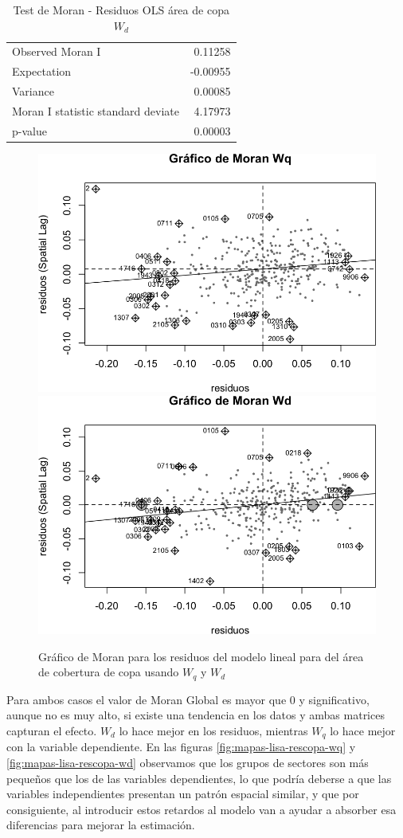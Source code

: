 \documentclass[12pt,]{book}
\begin{document}
\begin{table}

\caption{\label{tab:moran-rescopa-wd}Test de Moran - Residuos OLS área de copa $W_d$}
\centering
\begin{tabular}[t]{lr}
\toprule
  &  \\
\midrule
Observed Moran I & 0.11258\\
Expectation & -0.00955\\
Variance & 0.00085\\
Moran I statistic standard deviate & 4.17973\\
p-value & 0.00003\\
\bottomrule
\end{tabular}
\end{table}

\begin{figure}
\includegraphics[width=0.49\linewidth]{tesis-unigis_files/figure-latex/moranplot-rescopa-w-1} \includegraphics[width=0.49\linewidth]{tesis-unigis_files/figure-latex/moranplot-rescopa-w-2} \caption{Gráfico de Moran para los residuos del modelo lineal para del área de cobertura de copa usando $W_{q}$ y $W_{d}$ }\label{fig:moranplot-rescopa-w}
\end{figure}

Para ambos casos el valor de Moran Global es mayor que 0 y
significativo, aunque no es muy alto, si existe una tendencia en los
datos y ambas matrices capturan el efecto. \(W_d\) lo hace mejor en los
residuos, mientras \(W_q\) lo hace mejor con la variable dependiente. En
las figuras \ref{fig:mapas-lisa-rescopa-wq} y
\ref{fig:mapas-lisa-rescopa-wd} observamos que los grupos de sectores
son más pequeños que los de las variables dependientes, lo que podría
deberse a que las variables independientes presentan un patrón espacial
similar, y que por consiguiente, al introducir estos retardos al modelo
van a ayudar a absorber esa diferencias para mejorar la estimación.
\end{document}
